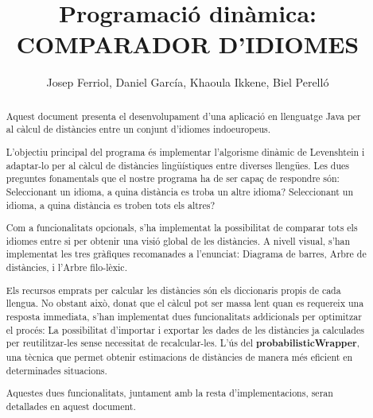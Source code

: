 \documentclass{ieeetj}
\begin{document}

\title{Programació dinàmica: COMPARADOR D'IDIOMES}

\author{Josep Ferriol, Daniel García, Khaoula Ikkene, Biel Perelló}  



\begin{abstract} 
Aquest document presenta el desenvolupament d'una aplicació en llenguatge Java per al càlcul de distàncies entre un conjunt d'idiomes indoeuropeus\cite{IndoEuropeanLanguages}.

L'objectiu principal del programa és implementar l'algorisme dinàmic de Levenshtein\cite{LevenshteinDistance} i adaptar-lo per al càlcul de distàncies lingüístiques entre diverses llengües. Les dues preguntes fonamentals que el nostre programa ha de ser capaç de respondre són:\newline
Seleccionant un idioma, a quina distància es troba un altre idioma?\newline
Seleccionant un idioma, a quina distància es troben tots els altres?\newline

Com a funcionalitats opcionals, s'ha implementat la possibilitat de comparar tots els idiomes entre si per obtenir una visió global de les distàncies. A nivell visual, s'han implementat les tres gràfiques recomanades a l'enunciat: Diagrama de barres, Arbre de distàncies, i l'Arbre filo-lèxic.

Els recursos emprats per calcular les distàncies són els diccionaris propis de cada llengua. No obstant això, donat que el càlcul pot ser massa lent quan es requereix una resposta immediata, s'han implementat dues funcionalitats addicionals per optimitzar el procés: \newline
La possibilitat d'importar i exportar les dades de les distàncies ja calculades per reutilitzar-les sense necessitat de recalcular-les.\newline
L'ús del \textbf{probabilisticWrapper}, una tècnica que permet obtenir estimacions de distàncies de manera més eficient en determinades situacions.\newline

Aquestes dues funcionalitats, juntament amb la resta d'implementacions, seran detallades en aquest document.

\end{abstract}
\end{document}

